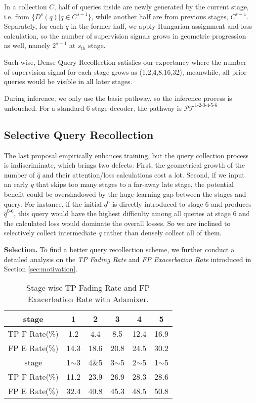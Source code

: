 \documentclass[10pt,twocolumn,letterpaper]{article}
\begin{document}
In a collection $C$, half of queries inside are newly generated by the current stage, i.e. from $\{D^s(q)|q\in C^{s-1}\}$, while another half are from previous stages, $C^{s-1}$. Separately, for each $q$ in the former half, we apply Hungarian assignment and loss calculation, so the number of supervision signals grows in geometric progression as well, namely $2^{s-1}$ at $s_{th}$ stage.

Such-wise, Dense Query Recollection satisfies our expectancy where the number of supervision signal for each stage grows as (1,2,4,8,16,32), meanwhile, all prior queries would be visible in all later stages.

During inference, we only use the basic pathway, so the inference process is untouched. For a standard 6-stage decoder, the pathway is $\mathcal{PT}^{1\text{-}2\text{-}3\text{-}4\text{-}5\text{-}6}$

\subsection{Selective Query Recollection}
The last proposal empirically enhances training, but the query collection process is indiscriminate, which brings two defects:
First, the geometrical growth of the number of $\hat{q}$ and their attention/loss calculations cost a lot. Second, if we input an early $q$ that skips too many stages to a far-away late stage, the potential benefit could be overshadowed by the huge learning gap between the stages and query. For instance, if the initial $q^0$ is directly introduced to stage 6 and produces $\hat{q}^{0\text{-}6}$, this query would have the highest difficulty among all queries at stage 6 and the calculated loss would dominate the overall losses. So we are inclined to selectively collect intermediate $q$ rather than densely collect all of them. 

\textbf{Selection.} To find a better query recollection scheme, we further conduct a detailed analysis on the \textit{TP Fading Rate} and \textit{FP Exacerbation Rate} introduced in Section \ref{sec:motivation}. 

\begin{table}[]
\centering
    \begin{tabular}{c|c|c|c|c|c}
        \toprule[1pt]
        stage          & 1   & 2 & 3 & 4 & 5   \\ 
        \midrule
        TP F Rate($\%$)&  1.2  & 4.4 & 8.5 & 12.4 &16.9   \\ 
        FP E Rate($\%$)&  14.3 & 18.6 & 20.8 & 24.5 & 30.2  \\
        \midrule[1pt]
        stage    &  1$\sim$3   & 4$\&$5 & 3$\sim$5 & 2$\sim$5 & 1$\sim$5  \\ 
        \midrule
        TP F Rate($\%$)&   11.2 & 23.9 & 26.9 & 28.3 & 28.6 \\ 
        FP E Rate($\%$)&   32.4 & 40.8 & 45.3 & 48.5 & 50.8 \\
        \bottomrule
    \end{tabular}
    \caption{Stage-wise TP Fading Rate and FP Exacerbation Rate with Adamixer.}
    \label{tab:dif_s4rates}
\end{table}
\end{document}
